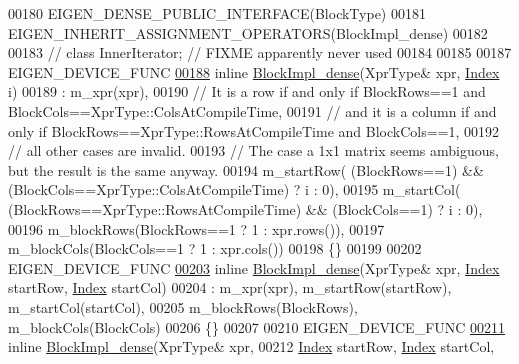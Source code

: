 \begin{DoxyCode}
00180     EIGEN\_DENSE\_PUBLIC\_INTERFACE(BlockType)
00181     EIGEN\_INHERIT\_ASSIGNMENT\_OPERATORS(BlockImpl\_dense)
00182 
00183     \textcolor{comment}{// class InnerIterator; // FIXME apparently never used}
00184 
00185     
00187     EIGEN\_DEVICE\_FUNC
\hyperlink{class_eigen_1_1internal_1_1_block_impl__dense_af68c0eafb607bb884cfe507bee39052e}{00188}     \textcolor{keyword}{inline} \hyperlink{class_eigen_1_1internal_1_1_block_impl__dense_af68c0eafb607bb884cfe507bee39052e}{BlockImpl\_dense}(XprType& xpr, \hyperlink{namespace_eigen_a62e77e0933482dafde8fe197d9a2cfde}{Index} i)
00189       : m\_xpr(xpr),
00190         \textcolor{comment}{// It is a row if and only if BlockRows==1 and BlockCols==XprType::ColsAtCompileTime,}
00191         \textcolor{comment}{// and it is a column if and only if BlockRows==XprType::RowsAtCompileTime and BlockCols==1,}
00192         \textcolor{comment}{// all other cases are invalid.}
00193         \textcolor{comment}{// The case a 1x1 matrix seems ambiguous, but the result is the same anyway.}
00194         m\_startRow( (BlockRows==1) && (BlockCols==XprType::ColsAtCompileTime) ? i : 0),
00195         m\_startCol( (BlockRows==XprType::RowsAtCompileTime) && (BlockCols==1) ? i : 0),
00196         m\_blockRows(BlockRows==1 ? 1 : xpr.rows()),
00197         m\_blockCols(BlockCols==1 ? 1 : xpr.cols())
00198     \{\}
00199 
00202     EIGEN\_DEVICE\_FUNC
\hyperlink{class_eigen_1_1internal_1_1_block_impl__dense_aa77daae8d8aef85ce9445cfd23363cbf}{00203}     \textcolor{keyword}{inline} \hyperlink{class_eigen_1_1internal_1_1_block_impl__dense_aa77daae8d8aef85ce9445cfd23363cbf}{BlockImpl\_dense}(XprType& xpr, \hyperlink{namespace_eigen_a62e77e0933482dafde8fe197d9a2cfde}{Index} startRow, 
      \hyperlink{namespace_eigen_a62e77e0933482dafde8fe197d9a2cfde}{Index} startCol)
00204       : m\_xpr(xpr), m\_startRow(startRow), m\_startCol(startCol),
00205                     m\_blockRows(BlockRows), m\_blockCols(BlockCols)
00206     \{\}
00207 
00210     EIGEN\_DEVICE\_FUNC
\hyperlink{class_eigen_1_1internal_1_1_block_impl__dense_a187c7918e6f200bf1d7d9a9c2f608547}{00211}     \textcolor{keyword}{inline} \hyperlink{class_eigen_1_1internal_1_1_block_impl__dense_a187c7918e6f200bf1d7d9a9c2f608547}{BlockImpl\_dense}(XprType& xpr,
00212           \hyperlink{namespace_eigen_a62e77e0933482dafde8fe197d9a2cfde}{Index} startRow, \hyperlink{namespace_eigen_a62e77e0933482dafde8fe197d9a2cfde}{Index} startCol,

\end{DoxyCode}
